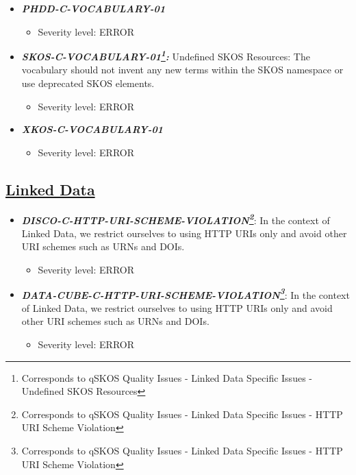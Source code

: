 \documentclass{llncs}
\begin{document}
\begin{itemize}
	\item \textbf{\em PHDD-C-VOCABULARY-01} 
	\begin{itemize}
		\item Severity level: ERROR
	\end{itemize}
\end{itemize}

\begin{itemize}
	\item \textbf{{\em SKOS-C-VOCABULARY-01\footnote{Corresponds to qSKOS Quality Issues - Linked Data Specific Issues - Undefined SKOS Resources}:}}
	Undefined SKOS Resources:
	The vocabulary should not invent any new terms within the SKOS namespace or use deprecated SKOS elements. 
	\begin{itemize}
		\item Severity level: ERROR
	\end{itemize}
\end{itemize}

\begin{itemize}
	\item \textbf{\em XKOS-C-VOCABULARY-01} 
	\begin{itemize}
		\item Severity level: ERROR
	\end{itemize}
\end{itemize}

\subsection{\underline{Linked Data}}

\begin{itemize}
	\item \textbf{\em DISCO-C-HTTP-URI-SCHEME-VIOLATION\footnote{Corresponds to qSKOS Quality Issues - Linked Data Specific Issues - HTTP URI Scheme Violation}}: 
	In the context of Linked Data, we restrict ourselves to using HTTP URIs only and avoid other URI schemes such as URNs and DOIs.
	\begin{itemize}
		\item Severity level: ERROR
	\end{itemize}
\end{itemize}

\begin{itemize}
	\item \textbf{\em DATA-CUBE-C-HTTP-URI-SCHEME-VIOLATION\footnote{Corresponds to qSKOS Quality Issues - Linked Data Specific Issues - HTTP URI Scheme Violation}}: 
	In the context of Linked Data, we restrict ourselves to using HTTP URIs only and avoid other URI schemes such as URNs and DOIs.
	\begin{itemize}
		\item Severity level: ERROR
	\end{itemize}
\end{itemize}
\end{document}
